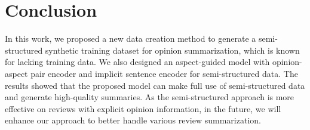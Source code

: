 \section{Conclusion}
\label{sec:conclude}
In this work,
we proposed a new data creation method to generate
a semi-structured synthetic training dataset for 
opinion summarization,
which is known for lacking training data.
We also designed an aspect-guided model with opinion-aspect pair encoder and implicit sentence encoder for semi-structured data.
The results showed that
the proposed model can make full use of semi-structured data
and generate high-quality summaries.
As the semi-structured approach is more effective on reviews with explicit opinion information, in the future,
we will enhance our approach to better handle various review summarization.


